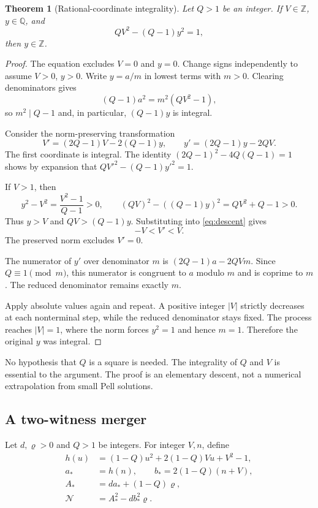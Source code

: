 \documentclass[11pt]{article}
\newtheorem{theorem}{Theorem}[section]
\theoremstyle{remark}\newtheorem{remark}[theorem]{Remark}
\newcommand{\Z}{\mathbb Z}\newcommand{\Q}{\mathbb Q}\newcommand{\N}{\mathbb N}\newcommand{\Pos}{\operatorname{Pos}}\newcommand{\Cone}{\mathcal C}\newcommand{\Con}{\operatorname{Con}}
\begin{document}
\begin{theorem}[Rational-coordinate integrality]\label{thm:saturation}
Let $Q>1$ be an integer. If $V\in\Z$, $y\in\Q$, and
\begin{equation}\label{eq:specialpell}
 QV^2-(Q-1)y^2=1,
\end{equation}
then $y\in\Z$.
\end{theorem}
\begin{proof}
The equation excludes $V=0$ and $y=0$. Change signs independently to assume $V>0$, $y>0$. Write $y=a/m$ in lowest terms with $m>0$. Clearing denominators gives
\[
 (Q-1)a^2=m^2(QV^2-1),
\]
so $m^2\mid Q-1$ and, in particular, $(Q-1)y$ is integral.

Consider the norm-preserving transformation
\begin{equation}\label{eq:descent}
 V'=(2Q-1)V-2(Q-1)y,\qquad
 y'=(2Q-1)y-2QV.
\end{equation}
The first coordinate is integral. The identity $(2Q-1)^2-4Q(Q-1)=1$ shows by expansion that $QV'^2-(Q-1)y'^2=1$.

If $V>1$, then
\[
 y^2-V^2=\frac{V^2-1}{Q-1}>0,
 \qquad
 (QV)^2-((Q-1)y)^2=QV^2+Q-1>0.
\]
Thus $y>V$ and $QV>(Q-1)y$. Substituting into \eqref{eq:descent} gives
\[
 -V<V'<V.
\]
The preserved norm excludes $V'=0$.

The numerator of $y'$ over denominator $m$ is $(2Q-1)a-2QVm$. Since $Q\equiv1\pmod m$, this numerator is congruent to $a$ modulo $m$ and is coprime to $m$. The reduced denominator remains exactly $m$.

Apply absolute values again and repeat. A positive integer $|V|$ strictly decreases at each nonterminal step, while the reduced denominator stays fixed. The process reaches $|V|=1$, where the norm forces $y^2=1$ and hence $m=1$. Therefore the original $y$ was integral.
\end{proof}

No hypothesis that $Q$ is a square is needed. The integrality of $Q$ and $V$ is essential to the argument. The proof is an elementary descent, not a numerical extrapolation from small Pell solutions.

\subsection{A two-witness merger}

Let $d,\varrho>0$ and $Q>1$ be integers. For integer $V,n$, define
\begin{align*}
 h(u)&=(1-Q)u^2+2(1-Q)Vu+V^2-1,\\
 a_*&=h(n),\qquad b_*=2(1-Q)(n+V),\\
 A_*&=d a_*+(1-Q)\varrho,\\
 \mathcal N&=A_*^2-d b_*^2\varrho.
\end{align*}
\end{document}
